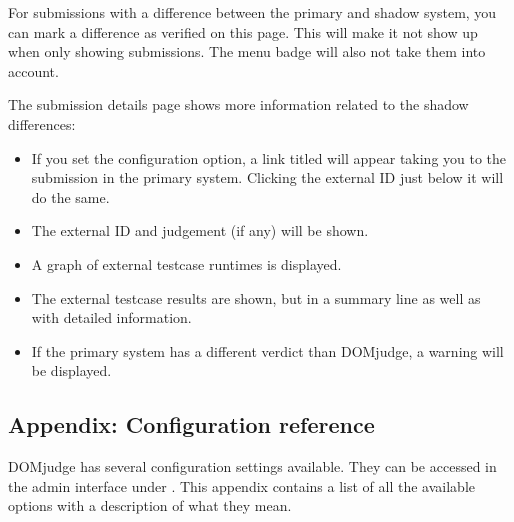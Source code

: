 \documentclass[a4paper,10pt,english,openany]{sphinxmanual}
\begin{document}
\sphinxAtStartPar
For submissions with a difference between the primary and shadow system,
you can mark a difference as verified on this page. This will make it not show
up when only showing  submissions. The menu badge will also not take
them into account.

\sphinxAtStartPar
The submission details page shows more information related to the shadow
differences:
\begin{itemize}
\item {} 
\sphinxAtStartPar
If you set the  configuration option, a link
titled  will appear taking you to the submission in the
primary system. Clicking the external ID just below it will do the same.

\item {} 
\sphinxAtStartPar
The external ID and judgement (if any) will be shown.

\item {} 
\sphinxAtStartPar
A graph of external testcase runtimes is displayed.

\item {} 
\sphinxAtStartPar
The external testcase results are shown, but in a summary line as well as
with detailed information.

\item {} 
\sphinxAtStartPar
If the primary system has a different verdict than DOMjudge, a warning will be
displayed.

\end{itemize}

\sphinxstepscope


\subsection{Appendix: Configuration reference}
\label{\detokenize{configuration-reference:appendix-configuration-reference}}\label{\detokenize{configuration-reference::doc}}
\sphinxAtStartPar
DOMjudge has several configuration settings available. They can be accessed in
the admin interface under . This appendix contains a
list of all the available options with a description of what they mean.
\end{document}
